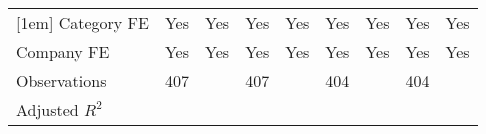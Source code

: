 {\begin{tabular}{l*{8}{c}}
[1em]
Category FE                        &       Yes         &       Yes         &       Yes         &       Yes         &       Yes         &       Yes         &       Yes         &       Yes         \\
[1em]
Company FE                         &       Yes         &       Yes         &       Yes         &       Yes         &       Yes         &       Yes         &       Yes         &       Yes         \\
\hline
Observations                       &       407         &                   &       407         &                   &       404         &                   &       404         &                   \\
Adjusted \(R^{2}\)                 &                   &                   &                   &                   &                   &                   &                   &                   \\
\hline\hline
\end{tabular}
}
